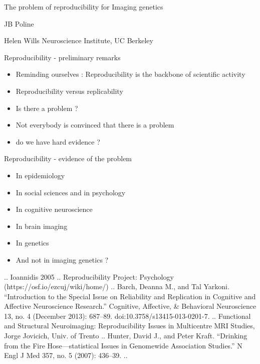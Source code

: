 \begin{frame}{The problem of reproducibility for Imaging genetics}

\begin{block}{JB Poline}

Helen Wills Neuroscience Institute, UC Berkeley

\end{block}

\end{frame}

\begin{frame}{Reproducibility - preliminary remarks}

\begin{itemize}
\itemsep1pt\parskip0pt
\item
  Reminding ourselves : Reproducibility is the backbone of scientific
  activity
\item
  Reproducibility versus replicability
\item
  Is there a problem ?
\item
  Not everybody is convinced that there is a problem
\item
  do we have hard evidence ?
\end{itemize}

\end{frame}

\begin{frame}{Reproducibility - evidence of the problem}

\begin{itemize}
\itemsep1pt\parskip0pt
\item
  In epidemiology
\item
  In social sciences and in psychology
\item
  In cognitive neuroscience
\item
  In brain imaging
\item
  In genetics
\item
  And not in imaging genetics ?
\end{itemize}

.. Ioannidis 2005 .. Reproducibility Project: Psychology
(https://osf.io/ezcuj/wiki/home/) .. Barch, Deanna M., and Tal Yarkoni.
``Introduction to the Special Issue on Reliability and Replication in
Cognitive and Affective Neuroscience Research.'' Cognitive, Affective,
\& Behavioral Neuroscience 13, no. 4 (December 2013): 687--89.
doi:10.3758/s13415-013-0201-7. .. Functional and Structural
Neuroimaging: Reproducibility Issues in Multicentre MRI Studies, Jorge
Jovicich, Univ. of Trento .. Hunter, David J., and Peter Kraft.
``Drinking from the Fire Hose---statistical Issues in Genomewide
Association Studies.'' N Engl J Med 357, no. 5 (2007): 436--39. ..

\end{frame}

